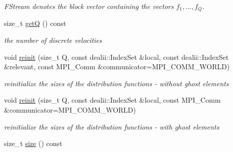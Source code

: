 \begin{DoxyCompactItemize}
\begin{DoxyCompactList}\small\item\em FStream denotes the block vector containing the vectors $ f_1, ..., f_Q $. \item\end{DoxyCompactList}\item 
\hypertarget{classnatrium_1_1DistributionFunctions_a2ab8e5abf8cdef76f62e443a8dde5fd4}{
size\_\-t \hyperlink{classnatrium_1_1DistributionFunctions_a2ab8e5abf8cdef76f62e443a8dde5fd4}{getQ} () const }
\label{classnatrium_1_1DistributionFunctions_a2ab8e5abf8cdef76f62e443a8dde5fd4}

\begin{DoxyCompactList}\small\item\em the number of discrete velocities \item\end{DoxyCompactList}\item 
\hypertarget{classnatrium_1_1DistributionFunctions_aefd3e3b6c39358653ac9531fa9f6f357}{
void \hyperlink{classnatrium_1_1DistributionFunctions_aefd3e3b6c39358653ac9531fa9f6f357}{reinit} (size\_\-t Q, const dealii::IndexSet \&local, const dealii::IndexSet \&relevant, const MPI\_\-Comm \&communicator=MPI\_\-COMM\_\-WORLD)}
\label{classnatrium_1_1DistributionFunctions_aefd3e3b6c39358653ac9531fa9f6f357}

\begin{DoxyCompactList}\small\item\em reinitialize the sizes of the distribution functions -\/ without ghost elements \item\end{DoxyCompactList}\item 
\hypertarget{classnatrium_1_1DistributionFunctions_a4a188cee7a5362588da36e30f616f446}{
void \hyperlink{classnatrium_1_1DistributionFunctions_a4a188cee7a5362588da36e30f616f446}{reinit} (size\_\-t Q, const dealii::IndexSet \&local, const MPI\_\-Comm \&communicator=MPI\_\-COMM\_\-WORLD)}
\label{classnatrium_1_1DistributionFunctions_a4a188cee7a5362588da36e30f616f446}

\begin{DoxyCompactList}\small\item\em reinitialize the sizes of the distribution functions -\/ with ghost elements \item\end{DoxyCompactList}\item 
\hypertarget{classnatrium_1_1DistributionFunctions_a636814c639143c76989b09b2a92b6757}{
size\_\-t \hyperlink{classnatrium_1_1DistributionFunctions_a636814c639143c76989b09b2a92b6757}{size} () const }
\label{classnatrium_1_1DistributionFunctions_a636814c639143c76989b09b2a92b6757}


\end{DoxyCompactItemize}
